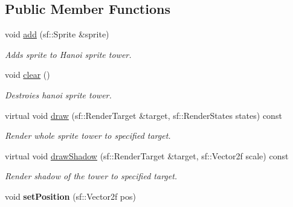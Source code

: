 \subsection*{Public Member Functions}
\begin{DoxyCompactItemize}
\item 
\mbox{\label{class_hanoi_model_aaea53a53ef9a3b0b15be67e92bb50c2d}} 
void \hyperlink{class_hanoi_model_aaea53a53ef9a3b0b15be67e92bb50c2d}{add} (sf\+::\+Sprite \&sprite)
\begin{DoxyCompactList}\small\item\em Adds sprite to \textquotesingle{}Hanoi sprite tower\textquotesingle{}. \end{DoxyCompactList}\item 
\mbox{\label{class_hanoi_model_a4585ec3d55128d71e5a55aacfd554aab}} 
void \hyperlink{class_hanoi_model_a4585ec3d55128d71e5a55aacfd554aab}{clear} ()
\begin{DoxyCompactList}\small\item\em Destroies hanoi sprite tower. \end{DoxyCompactList}\item 
\mbox{\label{class_hanoi_model_a995798e4b708ef0fc90b2c52a13bbfb8}} 
virtual void \hyperlink{class_hanoi_model_a995798e4b708ef0fc90b2c52a13bbfb8}{draw} (sf\+::\+Render\+Target \&target, sf\+::\+Render\+States states) const
\begin{DoxyCompactList}\small\item\em Render whole sprite tower to specified target. \end{DoxyCompactList}\item 
\mbox{\label{class_hanoi_model_ab3cb69b048c3857dd1d40c2dc80c50ec}} 
virtual void \hyperlink{class_hanoi_model_ab3cb69b048c3857dd1d40c2dc80c50ec}{draw\+Shadow} (sf\+::\+Render\+Target \&target, sf\+::\+Vector2f scale) const
\begin{DoxyCompactList}\small\item\em Render shadow of the tower to specified target. \end{DoxyCompactList}\item 
\mbox{\label{class_hanoi_model_a26a77037649d903df058066ab1d29ac1}} 
void {\bfseries set\+Position} (sf\+::\+Vector2f pos)

\end{DoxyCompactItemize}
